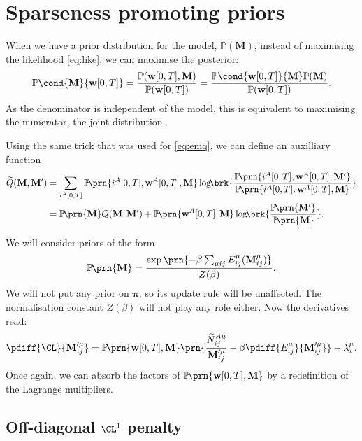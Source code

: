 \documentclass[12pt]{article}
\newcommand{\pib}{\boldsymbol{\pi}}
\newcommand{\w}{\mathbf{w}}
\newcommand{\M}{\mathbf{M}}
\newcommand{\pr}{\mathbb{P}}
\begin{document}
\section{Sparseness promoting priors \label{sec:priors}}

When we have a prior distribution for the model, $\pr(\M)$, instead of maximising the likelihood \eqref{eq:like}, we can maximise the posterior:
%
\begin{equation}\label{eq:posterior}
  \pr\cond{\M}{\w[0,T]} = \frac{ \pr(\w[0,T],\M) }{ \pr(\w[0,T]) } = \frac{ \pr\cond{\w[0,T]}{\M} \pr(\M) }{ \pr(\w[0,T]) }.
\end{equation}
%
As the denominator is independent of the model, this is equivalent to maximising the numerator, \ie the joint distribution.

Using the same trick that was used for \eqref{eq:emq}, we can define an auxilliary function
%
\begin{equation}\label{eq:emqprior}
\begin{aligned}
  \widetilde{Q}(\M,\M') &= \sum_{i^A[0,T]} \pr\!\prn{i^A[0,T],\w^A[0,T],\M} \log\!\! \brk{
      \frac{ \pr\!\prn{i^A[0,T],\w^A[0,T],\M'} }{ \pr\!\prn{i^A[0,T],\w^A[0,T],\M} } }\\
      &= \pr\!\prn{\M} Q(\M,\M') + \pr\!\prn{\w^A[0,T],\M} \log\!\! \brk{
      \frac{ \pr\!\prn{\M'} }{ \pr\!\prn{\M} } }.
\end{aligned}
\end{equation}
%

We will consider priors of the form
%
\begin{equation}\label{eq:priorsum}
  \pr\!\prn{\M} = \frac{\exp\prn{-\beta\sum_{\mu ij}E^\mu_{ij}(\M^\mu_{ij})}}{Z(\beta)}.
\end{equation}
%
We will not put any prior on $\pib$, so its update rule will be unaffected.
The normalisation constant $Z(\beta)$ will not play any role either.
Now the derivatives read:
%
\begin{equation}\label{eq:priordiffs}
  \pdiff{\CL}{\M'^\mu_{ij}} 
    = \pr\!\prn{\w[0,T],\M} \prn{ \frac{ \widetilde{N}^{A\mu}_{ij} }{ \M'^\mu_{ij} }  - \beta \pdiff{E^\mu_{ij}}{\M'^\mu_{ij}} }- \lambda^\mu_{i}.
\end{equation}
%
Once again, we can absorb the factors of $\pr\!\prn{\w[0,T],\M}$ by a redefinition of the Lagrange multipliers.


\subsection{Off-diagonal \texorpdfstring{$\CL^1$}{L\textasciicircum1} penalty \label{sec:offdiagL1}}
\end{document}
